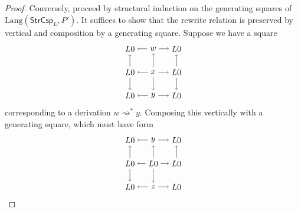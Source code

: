 \documentclass{amsart}
\newcommand{\StrCsp}{\cat{StrCsp}}
\newcommand{\Lang}{\mathrm{Lang}}
\newcommand{\cat}[1]{\mathsf{#1}}
\newcommand{\deriv}[2]{#1 \rightsquigarrow^\ast #2}
\theoremstyle{remark}
\theoremstyle{definition}
\begin{document}
\begin{proof}
  Conversely, proceed by structural induction on the generating
  squares of $ \Lang ( \StrCsp_L , P' ) $.  It suffices to show that
  the rewrite relation is preserved by vertical and composition by a
  generating square.  Suppose we have a square
  \[
    \begin{tikzpicture}
      \node (1t) at (0,2) {$ L 0 $};
      \node (2t) at (1,2) {$ w $};
      \node (3t) at (2,2) {$ L 0 $};
      \node (1m) at (0,1) {$ L 0 $};
      \node (2m) at (1,1) {$ x $};
      \node (3m) at (2,1) {$ L 0 $};
      \node (1b) at (0,0) {$ L 0 $};
      \node (2b) at (1,0) {$ y $};
      \node (3b) at (2,0) {$ L 0 $};
      \draw [->] (2t) to node [] {\scriptsize{$  $}} (1t);
      \draw [->] (2t) to node [] {\scriptsize{$  $}} (3t);
      \draw [->] (2m) to node [] {\scriptsize{$  $}} (1m);
      \draw [->] (2m) to node [] {\scriptsize{$  $}} (3m);
      \draw [->] (2b) to node [] {\scriptsize{$  $}} (1b);
      \draw [->] (2b) to node [] {\scriptsize{$  $}} (3b);
      \draw [->] (1m) to node [] {\scriptsize{$  $}} (1t);
      \draw [->] (2m) to node [] {\scriptsize{$  $}} (2t);
      \draw [->] (3m) to node [] {\scriptsize{$  $}} (3t);
      \draw [->] (1m) to node [] {\scriptsize{$  $}} (1b);
      \draw [->] (2m) to node [] {\scriptsize{$  $}} (2b);
      \draw [->] (3m) to node [] {\scriptsize{$  $}} (3b);
    \end{tikzpicture}
  \]
  corresponding to a derivation $ \deriv{w}{y} $. Composing this
  vertically with a generating square, which must have form
  \[
    \begin{tikzpicture}
      \node (1t) at (0,2) {$ L 0 $};
      \node (2t) at (1,2) {$ y $};
      \node (3t) at (2,2) {$ L 0 $};
      \node (1m) at (0,1) {$ L 0 $};
      \node (2m) at (1,1) {$ L 0 $};
      \node (3m) at (2,1) {$ L 0 $};
      \node (1b) at (0,0) {$ L 0 $};
      \node (2b) at (1,0) {$ z $};
      \node (3b) at (2,0) {$ L 0 $};
      \draw [->] (2t) to node [] {\scriptsize{$  $}} (1t);
      \draw [->] (2t) to node [] {\scriptsize{$  $}} (3t);
      \draw [->] (2m) to node [] {\scriptsize{$  $}} (1m);
      \draw [->] (2m) to node [] {\scriptsize{$  $}} (3m);
      \draw [->] (2b) to node [] {\scriptsize{$  $}} (1b);
      \draw [->] (2b) to node [] {\scriptsize{$  $}} (3b);
      \draw [->] (1m) to node [] {\scriptsize{$  $}} (1t);
      \draw [->] (2m) to node [] {\scriptsize{$  $}} (2t);
      \draw [->] (3m) to node [] {\scriptsize{$  $}} (3t);
      \draw [->] (1m) to node [] {\scriptsize{$  $}} (1b);
      \draw [->] (2m) to node [] {\scriptsize{$  $}} (2b);

\end{tikzpicture}\]
\end{proof}
\end{document}
